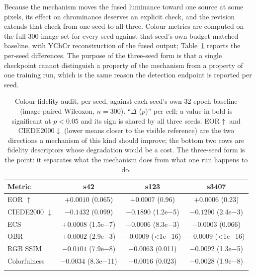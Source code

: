 \documentclass[pdflatex,sn-mathphys-num]{sn-jnl}
\theoremstyle{thmstyleone}%
\theoremstyle{thmstyletwo}%
\theoremstyle{thmstylethree}%
\begin{document}
Because the mechanism moves the fused luminance toward one source at some pixels, its effect on chrominance deserves an explicit check, and the revision extends that check from one seed to all three. Colour metrics are computed on the full 300-image set for every seed against that seed's own budget-matched baseline, with YCbCr reconstruction of the fused output; Table~\ref{tab:color} reports the per-seed differences. The purpose of the three-seed form is that a single checkpoint cannot distinguish a property of the mechanism from a property of one training run, which is the same reason the detection endpoint is reported per seed.

\begin{table}[t]
\caption{Colour-fidelity audit, per seed, against each seed's own 32-epoch baseline (image-paired Wilcoxon, $n = 300$). ``$\Delta$ ($p$)'' per cell; a value in bold is significant at $p<0.05$ and its sign is shared by all three seeds. EOR$\uparrow$ and CIEDE2000$\downarrow$ (lower means closer to the visible reference) are the two directions a mechanism of this kind should improve; the bottom two rows are fidelity descriptors whose degradation would be a cost. The three-seed form is the point: it separates what the mechanism does from what one run happens to do.}
\label{tab:color}%
\footnotesize
\setlength{\tabcolsep}{4pt}
\begin{tabular}{@{}lccc@{}}
\toprule
Metric & s42 & s123 & s3407 \\
\midrule
EOR $\uparrow$ & $+0.0010$ (0.065) & $+0.0007$ (0.96) & $+0.0006$ (0.23) \\
CIEDE2000 $\downarrow$ & $-0.1432$ (0.099) & $\mathbf{-0.1890}$ (1.2e$-$5) & $\mathbf{-0.1290}$ (2.4e$-$3) \\
ECS & $+0.0008$ (1.5e$-$7) & $-0.0006$ (8.3e$-$3) & $-0.0003$ (0.066) \\
OBR & $+0.0002$ (2.9e$-$3) & $-0.0009$ (<1e$-$16) & $-0.0009$ (<1e$-$16) \\
RGB SSIM & $\mathbf{-0.0101}$ (7.9e$-$8) & $\mathbf{-0.0063}$ (0.011) & $\mathbf{-0.0092}$ (1.3e$-$5) \\
Colorfulness & $\mathbf{-0.0034}$ (8.3e$-$11) & $\mathbf{-0.0016}$ (0.023) & $\mathbf{-0.0028}$ (1.9e$-$8) \\
\botrule
\end{tabular}
\end{table}
\end{document}
